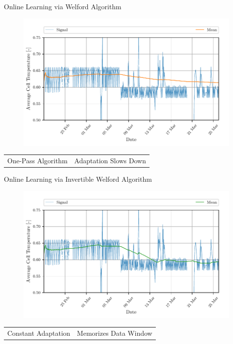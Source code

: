 \documentclass[aspectratio=169]{beamer}
\begin{document}
\begin{frame}{Online Learning via Welford Algorithm}
    \begin{figure}
        \begin{center}
            \includegraphics[width=0.62\linewidth]{../ilustrate/pc2023/bess/mean_signal.pdf}
        \end{center}
    \end{figure}
    \begin{table}
        \centering
        \begin{tabular}{c|c}
            {\color{green}{$+$}} One-Pass Algorithm & {\color{red}{$-$}} Adaptation Slows Down \\
        \end{tabular}
    \end{table}
\end{frame}

\begin{frame}{Online Learning via Invertible Welford Algorithm}
    \begin{figure}
        \begin{center}
            \includegraphics[width=0.62\linewidth]{../ilustrate/pc2023/bess/rmean_signal.pdf}
        \end{center}
    \end{figure}
    \begin{table}
        \centering
        \begin{tabular}{c|c}
            {\color{green}{$+$}} Constant Adaptation & {\color{red}{$-$}} Memorizes Data Window \\
        \end{tabular}
    \end{table}
\end{frame}
\end{document}
